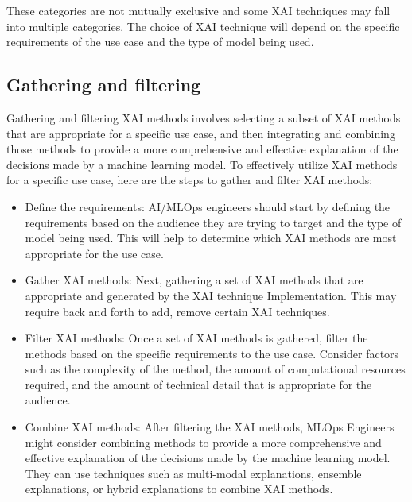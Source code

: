\documentclass[conference]{IEEEtran}
\begin{document}
These categories are not mutually exclusive and some XAI techniques may fall into multiple categories. The choice of XAI technique will depend on the specific requirements of the use case and the type of model being used.

\subsection{Gathering and filtering} Gathering and filtering XAI methods involves selecting a subset of XAI methods that are appropriate for a specific use case, and then integrating and combining those methods to provide a more comprehensive and effective explanation of the decisions made by a machine learning model. To effectively utilize XAI methods for a specific use case, here are the steps to gather and filter XAI methods: 
\begin{itemize}
	\item Define the requirements: AI/MLOps engineers should start by defining the requirements based on the audience they are trying to target and the type of model being used. This will help to determine which XAI methods are most appropriate for the use case.
	\item Gather XAI methods: Next, gathering a set of XAI methods that are appropriate and generated by the XAI technique Implementation. This may require back and forth to add, remove certain XAI techniques.
	\item Filter XAI methods: Once a set of XAI methods is gathered, filter the methods based on the specific requirements to the use case. Consider factors such as the complexity of the method, the amount of computational resources required, and the amount of technical detail that is appropriate for the audience.
	\item Combine XAI methods: After filtering the XAI methods, MLOps Engineers might consider combining methods to provide a more comprehensive and effective explanation of the decisions made by the machine learning model. They can use techniques such as multi-modal explanations, ensemble explanations, or hybrid explanations to combine XAI methods.
\end{itemize}
\end{document}
